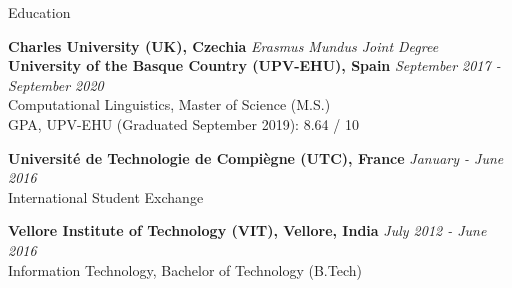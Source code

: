 \documentclass{resume}
\begin{document}



\begin{rSection}{Education}

    {\bf Charles University (UK), Czechia} \hfill 
        {\em Erasmus Mundus Joint Degree}\\
    {\bf University of the Basque Country (UPV-EHU), Spain} \hfill 
        {\em September 2017 - September 2020}\\
            Computational Linguistics, Master of Science (M.S.)\\
            GPA, UPV-EHU (Graduated September 2019): 8.64 / 10%
    
    {\bf Universit\'e de Technologie de Compi\`egne (UTC), France} \hfill
        {\em January - June 2016}\\
            International Student Exchange
            
    {\bf Vellore Institute of Technology (VIT), Vellore, India} \hfill
        {\em July 2012 - June 2016}\\
            Information Technology, Bachelor of Technology (B.Tech)
    
\end{rSection}

\end{document}
